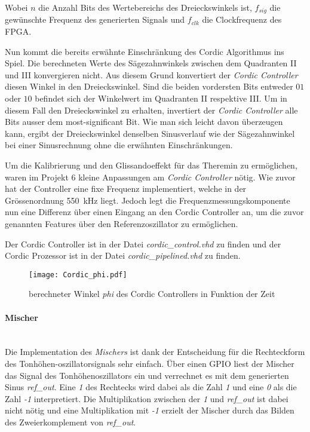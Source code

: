 Wobei \(n\) die Anzahl Bits des Wertebereichs des Dreieckswinkels ist, \(f_{sig}\) die gewünschte Frequenz des generierten Signals und \(f_{clk}\) die Clockfrequenz des FPGA.

Nun kommt die bereits erwähnte Einschränkung des Cordic Algorithmus ins Spiel. Die berechneten Werte des Sägezahnwinkels zwischen dem Quadranten II und III konvergieren nicht. Aus diesem Grund konvertiert der \textit{Cordic Controller} diesen Winkel in den Dreieckswinkel. Sind die beiden vordersten Bits entweder \(01\) oder \(10\) befindet sich der Winkelwert im Quadranten II respektive III. Um in diesem Fall den Dreieckswinkel zu erhalten, invertiert der \textit{Cordic Controller} alle Bits ausser dem most-significant Bit. Wie man sich leicht davon überzeugen kann, ergibt der Dreieckswinkel denselben Sinusverlauf wie der Sägezahnwinkel bei einer Sinusrechnung ohne die erwähnten Einschränkungen. \cite{Cordic}

Um die Kalibrierung und den Glissandoeffekt für das Theremin zu ermöglichen, waren im Projekt 6 kleine Anpassungen am \textit{Cordic Controller} nötig. Wie zuvor hat der Controller eine fixe Frequenz implementiert, welche in der Grössenordnung \SI{550}{kHz} liegt. Jedoch legt die Frequenzmessungskomponente nun eine Differenz über einen Eingang an den Cordic Controller an, um die zuvor genannten Features über den Referenzoszillator zu ermöglichen.

Der Cordic Controller ist in der Datei \textit{cordic\_control.vhd} zu finden und der Cordic Prozessor ist in der Datei \textit{cordic\_pipelined.vhd} zu finden.


\begin{figure}[t]
	\centering
	\texttt{[image: Cordic\_phi.pdf]}
	\caption{berechneter Winkel \textit{phi} des Cordic Controllers in Funktion der Zeit} 
	\label{img:Cordic_phi}
\end{figure}  


\paragraph{Mischer}\mbox{}\\

Die Implementation des \textit{Mischers} ist dank der Entscheidung für die Rechteckform des Tonhöhen-oszillatorsignals sehr einfach. Über einen GPIO liest der Mischer das Signal des Tonhöhenoszillators ein und verrechnet es mit dem generierten Sinus \textit{ref\_out}. Eine \textit{1} des Rechtecks wird dabei als die Zahl \textit{1} und eine \textit{0} als die Zahl \textit{-1} interpretiert. Die Multiplikation zwischen der \textit{1} und \textit{ref\_out} ist dabei nicht nötig und eine Multiplikation mit \textit{-1} erzielt der Mischer durch das Bilden des Zweierkomplement von \textit{ref\_out}.

